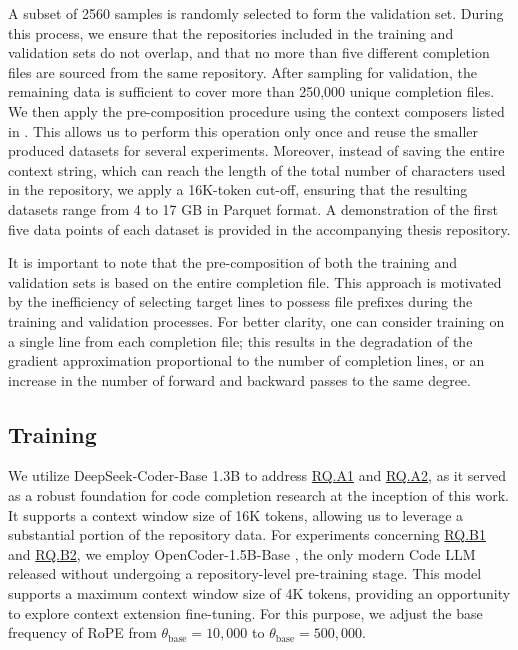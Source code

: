 A subset of 2560 samples is randomly selected to form the validation set. During this process, we ensure that the repositories included in the training and validation sets do not overlap, and that no more than five different completion files are sourced from the same repository. After sampling for validation, the remaining data is sufficient to cover more than 250,000 unique completion files. We then apply the pre-composition procedure using the context composers listed in . This allows us to perform this operation only once and reuse the smaller produced datasets for several experiments. Moreover, instead of saving the entire context string, which can reach the length of the total number of characters used in the repository, we apply a 16K-token cut-off, ensuring that the resulting datasets range from 4 to 17 GB in Parquet format. A demonstration of the first five data points of each dataset is provided in the accompanying thesis repository.

It is important to note that the pre-composition of both the training and validation sets is based on the entire completion file. This approach is motivated by the inefficiency of selecting target lines to possess file prefixes during the training and validation processes. For better clarity, one can consider training on a single line from each completion file; this results in the degradation of the gradient approximation proportional to the number of completion lines, or an increase in the number of forward and backward passes to the same degree.

\subsection{Training}\label{sec:training}

We utilize DeepSeek-Coder-Base 1.3B \parencite{guo2024} to address \hyperref[rq:rq-a1]{RQ.A1} and \hyperref[rq:rq-a2]{RQ.A2}, as it served as a robust foundation for code completion research at the inception of this work. It supports a context window size of 16K tokens, allowing us to leverage a substantial portion of the repository data. For experiments concerning \hyperref[rq:rq-b1]{RQ.B1} and \hyperref[rq:rq-b2]{RQ.B2}, we employ OpenCoder-1.5B-Base \parencite{huang2024}, the only modern Code LLM released without undergoing a repository-level pre-training stage. This model supports a maximum context window size of 4K tokens, providing an opportunity to explore context extension fine-tuning. For this purpose, we adjust the base frequency of RoPE from \(\theta_{\mathrm{base}} = 10{,}000\) to \(\theta_{\mathrm{base}} = 500{,}000\).

